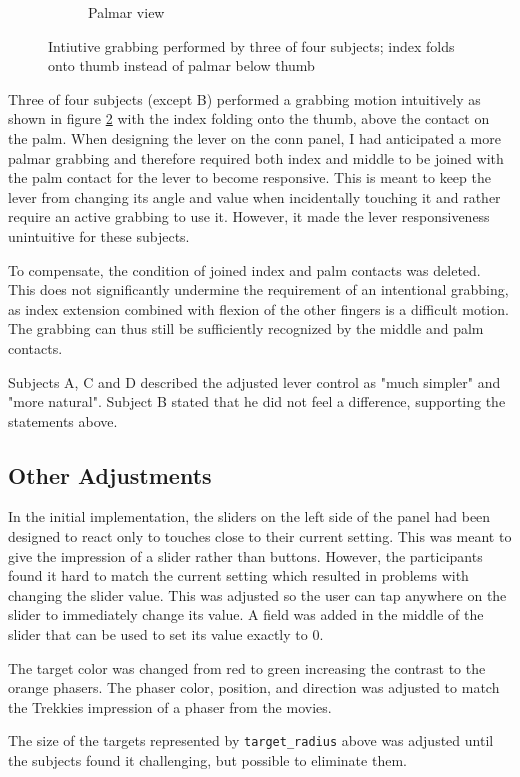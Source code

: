 \documentclass[hyperref, bachelorofscience]{cgvpub}
\begin{document}
\begin{figure}
\begin{subfigure}{.45\linewidth}
		\caption{Palmar view}
		\label{fig:grab:palmar}
	\end{subfigure}
	\caption{Intiutive grabbing performed by three of four subjects; index folds onto thumb instead of palmar below thumb}
	\label{fig:grab}
\end{figure}

Three of four subjects (except B) performed a grabbing motion intuitively as shown in figure \ref{fig:grab} with the index folding onto the thumb, above the contact on the palm. When designing the lever on the conn panel, I had anticipated a more palmar grabbing and therefore required both index and middle to be joined with the palm contact for the lever to become responsive. This is meant to keep the lever from changing its angle and value when incidentally touching it and rather require an active grabbing to use it. However, it made the lever responsiveness unintuitive for these subjects.

To compensate, the condition of joined index and palm contacts was deleted. This does not significantly undermine the requirement of an intentional grabbing, as index extension combined with flexion of the other fingers is a difficult motion. The grabbing can thus still be sufficiently recognized by the middle and palm contacts. 

Subjects A, C and D described the adjusted lever control as "much simpler" and "more natural". Subject B stated that he did not feel a difference, supporting the statements above.

\subsection{Other Adjustments}
In the initial implementation, the sliders on the left side of the panel had been designed to react only to touches close to their current setting. This was meant to give the impression of a slider rather than buttons. However, the participants found it hard to match the current setting which resulted in problems with changing the slider value. This was adjusted so the user can tap anywhere on the slider to immediately change its value. A field was added in the middle of the slider that can be used to set its value exactly to $ 0 $. 

The target color was changed from red to green increasing the contrast to the orange phasers. The phaser color, position, and direction was adjusted to match the Trekkies impression of a phaser from the movies.

The size of the targets represented by \lstinline|target_radius| above was adjusted until the subjects found it challenging, but possible to eliminate them.
\end{document}

